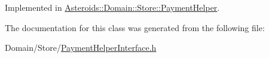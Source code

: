 Implemented in \hyperlink{classAsteroids_1_1Domain_1_1Store_1_1PaymentHelper_a94fe588a84f831f5717ea5dbf5eb2b2d}{Asteroids\+::\+Domain\+::\+Store\+::\+Payment\+Helper}.



The documentation for this class was generated from the following file\+:\begin{DoxyCompactItemize}
\item 
Domain/\+Store/\hyperlink{PaymentHelperInterface_8h}{Payment\+Helper\+Interface.\+h}\end{DoxyCompactItemize}
